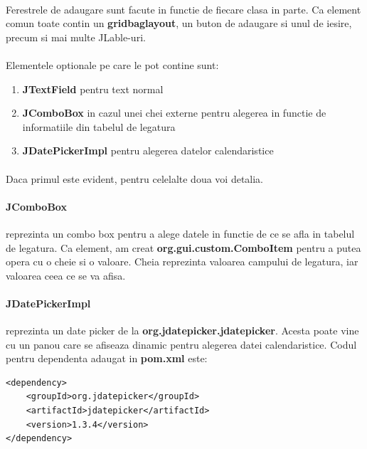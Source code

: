 \documentclass[oneside]{article}
\begin{document}
\paragraph{} Ferestrele de adaugare sunt facute in functie de fiecare clasa in parte. Ca element comun toate contin un \textbf{gridbaglayout}, un buton de adaugare si unul de iesire, precum si mai multe JLable-uri.

\paragraph{} Elementele optionale pe care le pot contine sunt:
\begin{enumerate}
    \item \textbf{JTextField} pentru text normal
    \item \textbf{JComboBox} in cazul unei chei externe pentru alegerea in functie de informatiile din tabelul de legatura
    \item \textbf{JDatePickerImpl} pentru alegerea datelor calendaristice
\end{enumerate}

\paragraph{} Daca primul este evident, pentru celelalte doua voi detalia.

\paragraph{JComboBox} reprezinta un combo box pentru a alege datele in functie de ce se afla in tabelul de legatura. Ca element, am creat \textbf{org.gui.custom.ComboItem} pentru a putea opera cu o cheie si o valoare. Cheia reprezinta valoarea campului de legatura, iar valoarea ceea ce se va afisa.

\paragraph{JDatePickerImpl} reprezinta un date picker de la \textbf{org.jdatepicker.jdatepicker}. Acesta poate vine cu un panou care se afiseaza dinamic pentru alegerea datei calendaristice. Codul pentru dependenta adaugat in \textbf{pom.xml} este:
\begin{center}
    \begin{lstlisting}
<dependency>
    <groupId>org.jdatepicker</groupId>
    <artifactId>jdatepicker</artifactId>
    <version>1.3.4</version>
</dependency>
    \end{lstlisting}
\end{center}
\end{document}
